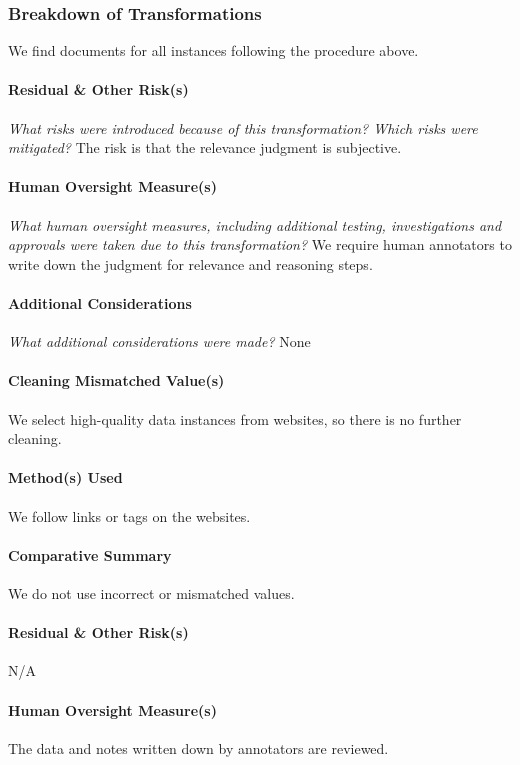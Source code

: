 \subsubsection{Breakdown of Transformations}
We find documents for all instances following the procedure above.

\paragraph{Residual \& Other Risk(s)}
\textit{What risks were introduced because of this transformation? Which risks were mitigated?}
The risk is that the relevance judgment is subjective.

\paragraph{Human Oversight Measure(s)}
\textit{What human oversight measures, including additional testing, investigations and approvals were taken due to this transformation?}
We require human annotators to write down the judgment for relevance and reasoning steps.

\paragraph{Additional Considerations}
\textit{What additional considerations were made?}
None

\paragraph{Cleaning Mismatched Value(s)}
We select high-quality data instances from websites, so there is no further cleaning.

\paragraph{Method(s) Used}
We follow links or tags on the websites.

\paragraph{Comparative Summary}
We do not use incorrect or mismatched values.

\paragraph{Residual \& Other Risk(s)}
N/A

\paragraph{Human Oversight Measure(s)}
The data and notes written down by annotators are reviewed.

